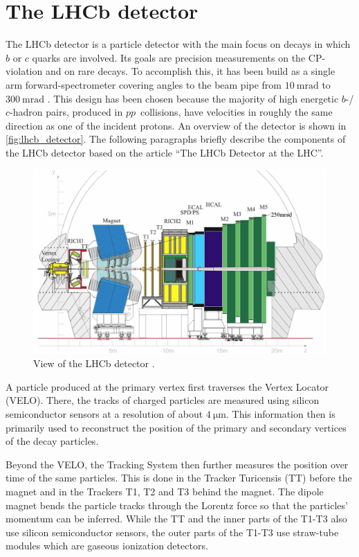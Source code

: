 \section{The LHCb detector}

The LHCb detector is a particle detector with the main focus on decays in which $b$ or $c$ quarks are involved.
Its goals are precision measurements on the CP-violation and on rare decays. 
To accomplish this, it has been build as a single arm forward-spectrometer covering angles to the beam pipe from $\qty{10}{\milli\radian}$ to $\qty{300}{\milli\radian}$ \cite{LHCb}. 
This design has been chosen because the majority of high energetic $b$-/$c$-hadron pairs, produced in $pp$~collisions, have velocities in roughly the same direction as one of the incident protons.
An overview of the detector is shown in \autoref{fig:lhcb_detector}.
The following paragraphs briefly describe the components of the LHCb detector based on the article \enquote{The LHCb Detector at the LHC}\cite{LHCb}.

\begin{figure}
    \centering
    \includegraphics[width=\textwidth]{images/lhcb_detector.png}
    \caption{View of the LHCb detector \cite{LHCb}. }
    \label{fig:lhcb_detector}
\end{figure}

A particle produced at the primary vertex first traverses the Vertex Locator (VELO). 
There, the tracks of charged particles are measured using silicon semiconductor sensors at a resolution of about $\qty{4}{\micro\meter}$. 
This information then is primarily used to reconstruct the position of the primary and secondary vertices of the decay particles.

Beyond the VELO, the Tracking System then further measures the position over time of the same particles. 
This is done in the Tracker Turicensis (TT) before the magnet and in the Trackers T1, T2 and T3 behind the magnet.
The dipole magnet bends the particle tracks through the Lorentz force so that the particles' momentum can be inferred.
While the TT and the inner parts of the T1-T3 also use silicon semiconductor sensors, the outer parts of the T1-T3 use straw-tube modules which are gaseous ionization detectors. 

